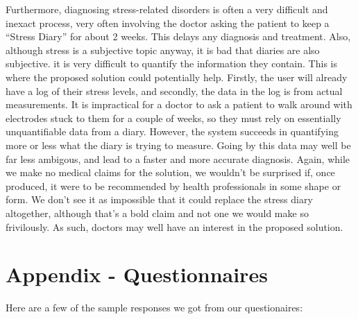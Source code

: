 \documentclass{scrartcl}
\begin{document}
Furthermore, diagnosing stress-related disorders is often a very difficult and inexact process, very often involving the doctor
asking the patient to keep a ``Stress Diary'' for about 2 weeks. This 
delays any diagnosis and treatment.
Also, although stress is a subjective topic anyway, it is bad that diaries are also subjective. it is very difficult to
quantify the information they contain. This is where the proposed solution could potentially help.
Firstly, the user will already have a log of their stress
levels, and secondly, the data in the log is from actual
measurements. It is impractical for a doctor to ask a patient to walk around with electrodes stuck to them for a couple of weeks,
so they must rely on essentially unquantifiable data from a diary. However, the system succeeds in quantifying more or less what
the diary is trying to measure. Going by this data may well be far less ambigous, and lead to a faster and
more accurate diagnosis. Again, while we make no medical claims for the solution, we wouldn't be surprised if, once produced,
it were to be recommended by health professionals in some shape or form. We don't see it as impossible that it could replace
the stress diary altogether, although that's a bold claim and not one we would make so frivilously. As such, doctors may
well have an interest in the proposed solution.

\section{Appendix - Questionnaires}
Here are a few of the sample responses we got from our questionaires:






\end{document}
